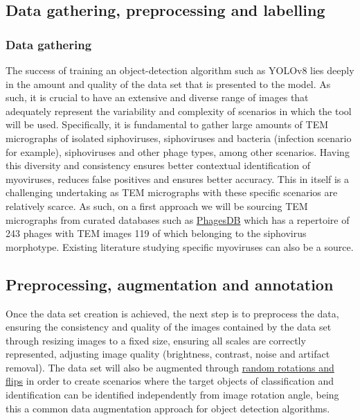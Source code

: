 \documentclass[runningheads]{llncs}
\begin{document}
\subsection{Data gathering, preprocessing and labelling}

\subsubsection{Data gathering}

The success of training an object-detection algorithm such as YOLOv8 lies deeply in the amount and quality of the data set that is presented to the model. As such, it is crucial to have an extensive and diverse range of images that adequately represent the variability and complexity of scenarios in which the tool will be used. 
Specifically, it is fundamental to gather large amounts of TEM micrographs of isolated siphoviruses, siphoviruses and bacteria (infection scenario for example), siphoviruses and other phage types, among other scenarios. Having this diversity and consistency ensures better contextual identification of myoviruses, reduces false positives and ensures better accuracy. This in itself is a challenging undertaking as TEM micrographs with these specific scenarios are relatively scarce. As such, on a first approach we will be sourcing TEM micrographs from curated databases such as \href{https://phagesdb.org/}{PhagesDB} which has a repertoire of 243 phages with TEM images 119 of which belonging to the siphovirus morphotype. Existing literature studying specific myoviruses can also be a source.

\subsection{Preprocessing, augmentation and annotation}
Once the data set creation is achieved, the next step is to preprocess the data, ensuring the consistency and quality of the images contained by the data set through resizing images to a fixed size, ensuring all scales are correctly represented, adjusting image quality (brightness, contrast, noise and artifact removal). The data set will also be augmented through \href{https://blog.roboflow.com/why-and-how-to-implement-random-rotate-data-augmentation/}{random rotations and flips} in order to create scenarios where the target objects of classification and identification can be identified independently from image rotation angle, being this a common data augmentation approach for object detection algorithms. \cite{gonzalez2023} 
\end{document}
